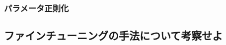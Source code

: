 \documentclass[uplatex,titlepage]{jsarticle}
\newif\iffigure
\begin{document}
\subsubsection{パラメータ正則化}
\iffigure
\begin{figure}[H]%
    \begin{center}
    \texttt{[image: param\_regular\_model.png]} 
    \caption{パラメータ正則化のモデル}
    \end{center}
\end{figure}
\fi

\iffigure
\begin{figure}[H]
\begin{minipage}{8cm}%
  \begin{center}
   \texttt{[image: param\_regular\_acc.png]} \\
   \caption{パラメータ正則化したときの正答率の推移}
  \end{center}
\end{minipage}
\hfill
\begin{minipage}{8cm}%
  \begin{center}
    \texttt{[image: param\_regular\_loss.png]} \\
    \caption{パラメータ正則化したときの損失の推移}
  \end{center}
\end{minipage}
\end{figure}
\fi

\subsection{ファインチューニングの手法について考察せよ}
\iffigure
\begin{figure}[H]%
    \begin{center}
    \texttt{[image: vgg16\_model.png]} 
    \caption{VGG16モデル}
    \end{center}
\end{figure}
\fi
\iffigure
\begin{figure}[H]%
    \begin{center}
    \texttt{[image: finetyu\_before.png]} 
    \caption{ファインチューニングに用いたモデル}
    \end{center}
\end{figure}
\fi
\end{document}
